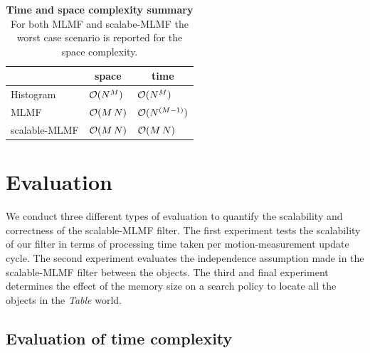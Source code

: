 
\begin{table}
 \centering
 \begin{tabular}{c|c|c|}
\cline{2-3}
				        &    \textbf{space}   &     \textbf{time} \\ \hline
    \multicolumn{1}{|l}{Histogram}      & \multicolumn{1}{|l}{$\operatorname{\mathcal{O}}(N^M)$}   &  \multicolumn{1}{|l|}{$\operatorname{\mathcal{O}}(N^M)$}      \\ \hline
    \multicolumn{1}{|l}{MLMF}           & \multicolumn{1}{|l}{$\operatorname{\mathcal{O}}(M\,N)$}  &  \multicolumn{1}{|l|}{$\operatorname{\mathcal{O}}(N^{(M-1)})$} \\ \hline
    \multicolumn{1}{|l}{scalable-MLMF}  & \multicolumn{1}{|l}{$\operatorname{\mathcal{O}}(M\,N)$}  &  \multicolumn{1}{|l|}{$\operatorname{\mathcal{O}}(M\,N)$}     \\ \hline
   \end{tabular}
   \caption{\textbf{Time and space complexity summary} For both MLMF and scalabe-MLMF the worst case scenario is reported for the space complexity.}
   \label{tab:time_space_summary}
\end{table}



\section{Evaluation}\label{ch5:evaluation}

We conduct three different types of evaluation to quantify the scalability and correctness of the scalable-MLMF filter. The first experiment
tests the scalability of our filter in terms of processing time taken per motion-measurement update cycle. The second experiment evaluates the independence 
assumption made in the scalable-MLMF filter between the objects. The third and final experiment determines the effect of the 
memory size on a search policy to locate all the objects in the \textit{Table} world.

\subsection{Evaluation of time complexity}

